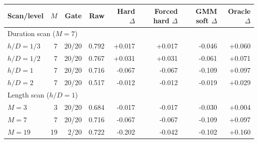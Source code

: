 \begin{tabular}{lrrrrrrr}
\toprule
Scan/level & $M$ & Gate & Raw & Hard $\Delta$ & Forced hard $\Delta$ & GMM soft $\Delta$ & Oracle $\Delta$ \\
\midrule
\multicolumn{8}{l}{Duration scan ($M=7$)} \\
$h/D=1/3$ & 7 & 20/20 & 0.792 & +0.017 & +0.017 & -0.046 & +0.060 \\
$h/D=1/2$ & 7 & 20/20 & 0.767 & +0.031 & +0.031 & -0.061 & +0.071 \\
$h/D=1$ & 7 & 20/20 & 0.716 & -0.067 & -0.067 & -0.109 & +0.097 \\
$h/D=2$ & 7 & 20/20 & 0.517 & -0.012 & -0.012 & -0.019 & +0.029 \\
\midrule
\multicolumn{8}{l}{Length scan ($h/D=1$)} \\
$M=3$ & 3 & 20/20 & 0.684 & -0.017 & -0.017 & -0.030 & +0.004 \\
$M=7$ & 7 & 20/20 & 0.716 & -0.067 & -0.067 & -0.109 & +0.097 \\
$M=19$ & 19 & 2/20 & 0.722 & -0.202 & -0.042 & -0.102 & +0.160 \\
\bottomrule
\end{tabular}
